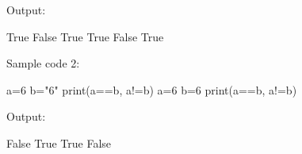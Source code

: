 \begin{flushleft}
	Output:
	\begin{tcolorbox}[breakable,notitle,boxrule=-0pt,colback=output,colframe=output]
			\color{black}
			True False \newline
			True True \newline
			False True
			\font=4pt
	\end{tcolorbox}
	\bigskip \bigskip
	Sample code 2:
		\begin{tcolorbox}[breakable,notitle,boxrule=-0pt,colback=code,colframe=code]
		\color{white}
		\font=8pt
		a=6 \newline
		b="6" \newline
		print(a==b, a!=b) \newline
		a=6 \newline
		b=6 \newline
		print(a==b, a!=b)
		\font=4pt
	\end{tcolorbox}
	
	Output:
	\begin{tcolorbox}[breakable,notitle,boxrule=-0pt,colback=output,colframe=output]
		\color{black}
		False True \newline
		True False
		\font=4pt
	\end{tcolorbox}
\end{flushleft}

\newpage





